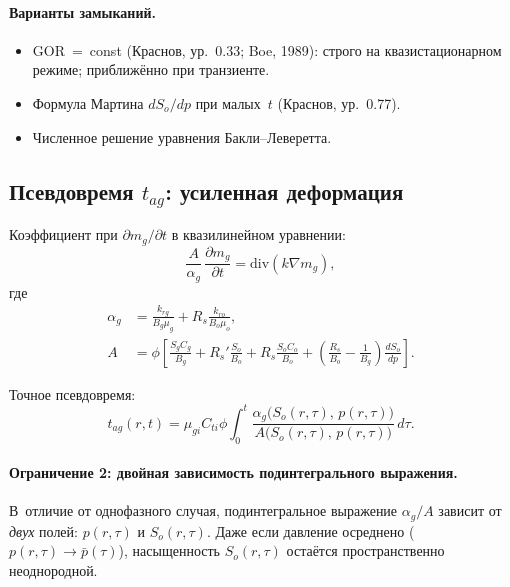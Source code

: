 \documentclass[12pt,a4paper]{article}
\begin{document}
\paragraph{Варианты замыканий.}
\begin{itemize}[nosep]
  \item GOR~=~const (Краснов, ур.~0.33; Boe, 1989):
        строго на квазистационарном режиме;
        приближённо при транзиенте.
  \item Формула Мартина $dS_o/dp$ при малых~$t$
        (Краснов, ур.~0.77).
  \item Численное решение уравнения Бакли--Леверетта.
\end{itemize}

\subsection{Псевдовремя $t_{ag}$: усиленная деформация}

Коэффициент при $\partial m_g/\partial t$ в квазилинейном
уравнении:
\begin{equation}\label{eq:oil_nonlin}
  \frac{A}{\alpha_g}\,\frac{\partial m_g}{\partial t}
  = \mathrm{div}(k\nabla m_g),
\end{equation}
где
\begin{align}
  \alpha_g &= \frac{k_{rg}}{B_g\mu_g}
  + R_s\frac{k_{ro}}{B_o\mu_o}, \label{eq:alpha_g}\\
  A &= \phi\left[\frac{S_g C_g}{B_g}
  + R_s'\frac{S_o}{B_o} + R_s\frac{S_o C_o}{B_o}
  + \left(\frac{R_s}{B_o} - \frac{1}{B_g}\right)
  \frac{dS_o}{dp}\right]. \label{eq:A_coeff}
\end{align}

Точное псевдовремя:
\begin{equation}\label{eq:tag_exact}
  t_{ag}(r,t) = \mu_{gi}C_{ti}\phi\int_0^t
  \frac{\alpha_g\bigl(S_o(r,\tau),\,p(r,\tau)\bigr)}
       {A\bigl(S_o(r,\tau),\,p(r,\tau)\bigr)}\,d\tau.
\end{equation}

\paragraph{Ограничение 2: двойная зависимость подинтегрального
выражения.}
В~отличие от однофазного случая, подинтегральное выражение
$\alpha_g/A$ зависит от \emph{двух} полей: $p(r,\tau)$ и
$S_o(r,\tau)$. Даже если давление осреднено
($p(r,\tau) \to \bar{p}(\tau)$), насыщенность
$S_o(r,\tau)$ остаётся пространственно неоднородной.
\end{document}
